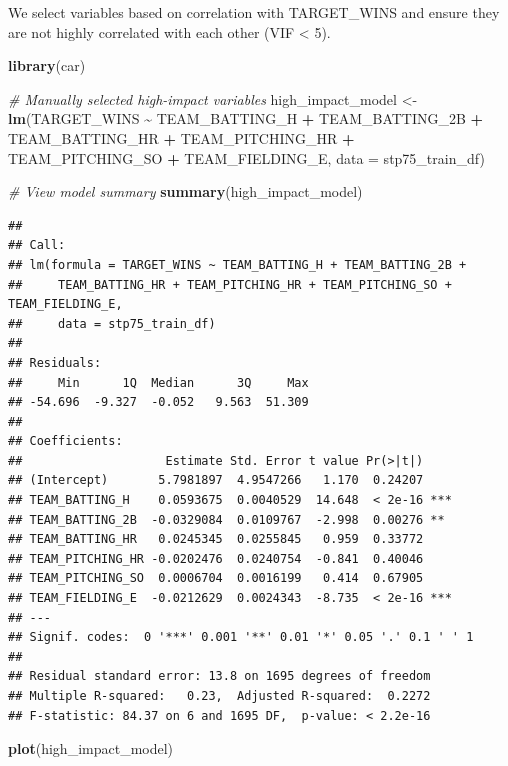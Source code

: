 \documentclass[
]{article}
\newenvironment{Shaded}{\begin{snugshade}}{\end{snugshade}}
\newcommand{\AttributeTok}[1]{\textcolor[rgb]{0.13,0.29,0.53}{#1}}
\newcommand{\CommentTok}[1]{\textcolor[rgb]{0.56,0.35,0.01}{\textit{#1}}}
\newcommand{\FunctionTok}[1]{\textcolor[rgb]{0.13,0.29,0.53}{\textbf{#1}}}
\newcommand{\NormalTok}[1]{#1}
\newcommand{\OtherTok}[1]{\textcolor[rgb]{0.56,0.35,0.01}{#1}}
\newcommand{\SpecialCharTok}[1]{\textcolor[rgb]{0.81,0.36,0.00}{\textbf{#1}}}
\begin{document}
We select variables based on correlation with TARGET\_WINS and ensure
they are not highly correlated with each other (VIF \textless{} 5).

\begin{Shaded}
\begin{Highlighting}[]
\FunctionTok{library}\NormalTok{(car)}

\CommentTok{\# Manually selected high{-}impact variables}
\NormalTok{high\_impact\_model }\OtherTok{\textless{}{-}} \FunctionTok{lm}\NormalTok{(TARGET\_WINS }\SpecialCharTok{\textasciitilde{}}\NormalTok{ TEAM\_BATTING\_H }\SpecialCharTok{+}\NormalTok{ TEAM\_BATTING\_2B }\SpecialCharTok{+}\NormalTok{ TEAM\_BATTING\_HR }\SpecialCharTok{+}
\NormalTok{                        TEAM\_PITCHING\_HR }\SpecialCharTok{+}\NormalTok{ TEAM\_PITCHING\_SO }\SpecialCharTok{+}\NormalTok{ TEAM\_FIELDING\_E, }\AttributeTok{data =}\NormalTok{ stp75\_train\_df)}

\CommentTok{\# View model summary}
\FunctionTok{summary}\NormalTok{(high\_impact\_model)}
\end{Highlighting}
\end{Shaded}

\begin{verbatim}
## 
## Call:
## lm(formula = TARGET_WINS ~ TEAM_BATTING_H + TEAM_BATTING_2B + 
##     TEAM_BATTING_HR + TEAM_PITCHING_HR + TEAM_PITCHING_SO + TEAM_FIELDING_E, 
##     data = stp75_train_df)
## 
## Residuals:
##     Min      1Q  Median      3Q     Max 
## -54.696  -9.327  -0.052   9.563  51.309 
## 
## Coefficients:
##                    Estimate Std. Error t value Pr(>|t|)    
## (Intercept)       5.7981897  4.9547266   1.170  0.24207    
## TEAM_BATTING_H    0.0593675  0.0040529  14.648  < 2e-16 ***
## TEAM_BATTING_2B  -0.0329084  0.0109767  -2.998  0.00276 ** 
## TEAM_BATTING_HR   0.0245345  0.0255845   0.959  0.33772    
## TEAM_PITCHING_HR -0.0202476  0.0240754  -0.841  0.40046    
## TEAM_PITCHING_SO  0.0006704  0.0016199   0.414  0.67905    
## TEAM_FIELDING_E  -0.0212629  0.0024343  -8.735  < 2e-16 ***
## ---
## Signif. codes:  0 '***' 0.001 '**' 0.01 '*' 0.05 '.' 0.1 ' ' 1
## 
## Residual standard error: 13.8 on 1695 degrees of freedom
## Multiple R-squared:   0.23,  Adjusted R-squared:  0.2272 
## F-statistic: 84.37 on 6 and 1695 DF,  p-value: < 2.2e-16
\end{verbatim}

\begin{Shaded}
\begin{Highlighting}[]
\FunctionTok{plot}\NormalTok{(high\_impact\_model)}
\end{Highlighting}
\end{Shaded}
\end{document}

